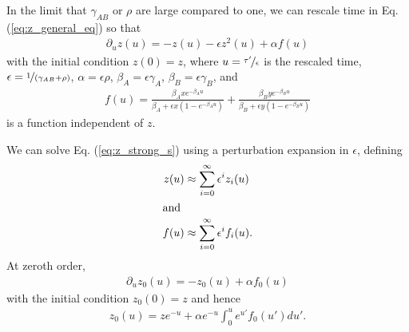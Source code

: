 \documentclass[11pt]{article}
\begin{document}
In the limit that $\gamma_{AB}$ or $\rho$ are large compared to one, we can rescale time in Eq. (\ref{eq:z_general_eq}) so that
\begin{align}\label{eq:z_strong_s}
    \partial_{u} z(u) = -z(u) - \epsilon z^2(u) + \alpha f(u)
\end{align}
with the initial condition $z(0) = z$, where $u= \nicefrac{\tau'}{\epsilon}$ is the rescaled time, $\epsilon = \nicefrac{1}{(\gamma_{AB}+\rho)}$, $\alpha = \epsilon \rho$, $\beta_A = \epsilon \gamma_A$, $\beta_B = \epsilon \gamma_B$, and 
\begin{align}
    f(u) = \frac{\beta_Axe^{-\beta_A u}}{\beta_A + \epsilon x(1-e^{-\beta_A u})} + \frac{\beta_B ye^{-\beta_B u}}{\beta_B + \epsilon y(1-e^{-\beta_B u})}
\end{align}
is a function independent of $z$.

We can solve Eq. (\ref{eq:z_strong_s}) using a perturbation expansion in $\epsilon$, defining 
\begin{subequations}\begin{align}
    z (u) &\approx \sum_{i=0}^\infty \epsilon^i z_i (u) \\
    \intertext{and}
    f (u) &\approx \sum_{i=0}^\infty \epsilon^i f_i (u).\label{eq:f(u)_series}
\end{align}\end{subequations}
At zeroth order,
\begin{align}
    \partial_u z_0(u) = -z_0(u) + \alpha f_0(u)  
\end{align}
with the initial condition $z_0(0) = z$ and hence 
\begin{align}
    z_0(u) = ze^{-u} + \alpha e^{-u} \int_0^u e^{u'} f_0(u') du'.
\end{align}
\end{document}

